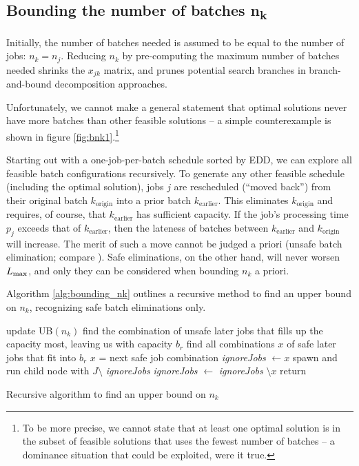 \documentclass[13pt, letterpaper, oneside]{book}
\begin{document}
\subsection[Bounding the number of batches $n_k$]{Bounding the number of batches
\sansitalicfont n\textsubscript{k}}\label{sec:bounding_nk}
Initially, the number of batches needed is assumed to be equal to the number of
jobs: $n_k = n_j$. Reducing $n_k$ by pre-computing the maximum number of batches
needed shrinks the $x_{jk}$ matrix, and prunes potential search branches in
branch-and-bound decomposition approaches.


Unfortunately, we cannot make a general statement that optimal solutions never
have more batches than other feasible solutions -- a simple counterexample is
shown in figure \ref{fig:bnk1}.\footnote{To be more precise, we cannot state
that at least one optimal solution is in the subset of feasible solutions that
uses the fewest number of batches -- a dominance situation that could be
exploited, were it true.}

Starting out with a one-job-per-batch schedule sorted by EDD, we can explore
all feasible batch configurations recursively. To generate any other feasible
schedule (including the optimal solution), jobs $j$ are rescheduled (``moved back'')
from their original batch $k_\text{origin}$ into a prior batch
$k_\text{earlier}$. This eliminates $k_\text{origin}$ and requires, of course,
that $k_\text{earlier}$ has sufficient capacity. If the job's processing time
$p_j$ exceeds that of $k_\text{earlier}$, then the lateness of batches between
$k_\text{earlier}$ and $k_\text{origin}$ will increase. The merit of such a move
cannot be judged a priori (unsafe batch elimination; compare ).
Safe eliminations, on the other hand, will never worsen $L_{\text{max}}$, and
only they can be considered when bounding $n_k$ a priori.

Algorithm \ref{alg:bounding_nk} outlines a recursive method to find an upper
bound on $n_k$, recognizing safe batch eliminations only.

\begin{algorithm}[h]
\fontsize{9pt}{11.5pt}\selectfont
\begin{algorithmic}
 
  \State update UB$(n_k)$
\EndIf
\State find the combination of unsafe later jobs that fills up the capacity
most, leaving us with capacity $b_r$ 
\State find all combinations $x$ of safe later jobs that fit into $b_r$
\Repeat
  \State $x$ = next safe job combination
  \State \textit{ignoreJobs} $\gets x$ 
  \State spawn and run child node with $J \setminus$ \textit{ignoreJobs}
  \State \textit{ignoreJobs} $\gets$ \textit{ignoreJobs} $\setminus x$
\State return
\end{algorithmic}
\caption{Recursive algorithm to find an upper bound on $n_k$}
\label{alg:bounding_nk}
\end{algorithm}
\end{document}
